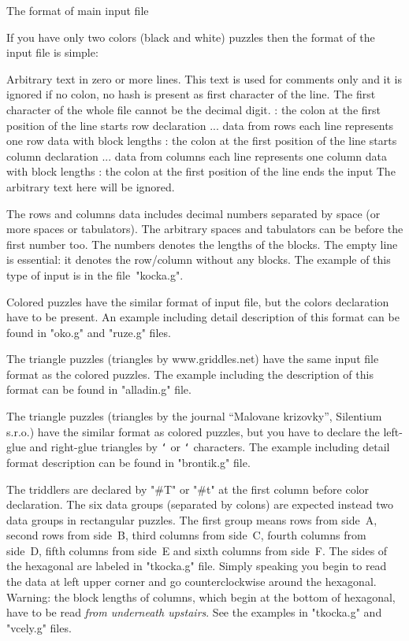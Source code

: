 \tit The format of main input file

If you have only two colors (black and white) puzzles then the format
of the input file is simple:

\begtt
Arbitrary text in zero or more lines. This text is used for comments
only and it is ignored if no colon, no hash is present as first
character of the line. 
The first character of the whole file cannot be the decimal digit.
: the colon at the first position of the line starts row declaration
... data from rows
    each line represents one row data with block lengths
: the colon at the first position of the line starts column declaration
... data from columns
    each line represents one column data with block lengths    
: the colon at the first position of the line ends the input
The arbitrary text here will be ignored.
\endtt

The rows and columns data includes decimal numbers separated by
space (or more spaces or tabulators). The arbitrary spaces and
tabulators can be before the first number too.
The numbers denotes the lengths of the blocks.
The empty line is essential: it denotes the row/column without
any blocks. The example of this type of input is in the 
file~"kocka.g".

Colored puzzles have the similar format of input file, but the colors
declaration have to be present. An example including detail
description of this format can be found in "oko.g" and "ruze.g" files.

The triangle puzzles (triangles by www.griddles.net) have the same
input file format as the colored puzzles. The example including the 
description of this format can be found in "alladin.g" file.

The triangle puzzles (triangles by the journal ``Malovane krizovky'',
Silentium s.r.o.) have the similar format as colored puzzles, but
you have to declare the left-glue and right-glue triangles by
{\tt\char`\<} or {\tt\char`\>} characters. The example including
detail format description can be found in "brontik.g" file. 

The triddlers are declared by "#T" or "#t" at the first column
before color declaration. The six data groups (separated by
colons) are expected instead two data groups in rectangular puzzles.
The first group means rows from side~A, second rows from side~B,
third columns from side~C, fourth columns from side~D, fifth columns
from side~E and sixth columns from side~F. The sides of the hexagonal are 
labeled in "tkocka.g" file. Simply speaking you begin to read the data
at left upper corner and go counterclockwise around the hexagonal.
Warning: the block lengths of columns, which begin at the bottom of
hexagonal, have to be read {\it from underneath upstairs}.
See the examples in "tkocka.g" and "vcely.g" files.

